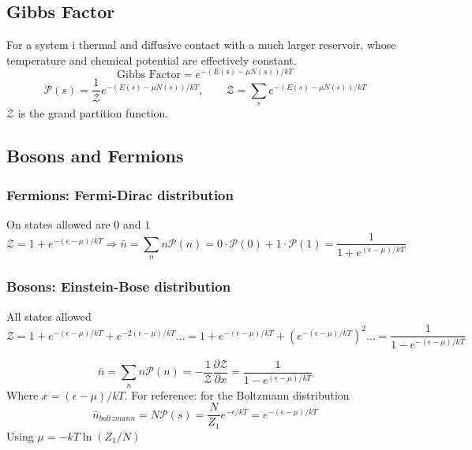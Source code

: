 \documentclass[a4paper,norsk, 10pt]{article}
\begin{document}
\subsection{Gibbs Factor}
For a system i thermal and diffusive contact with a much larger reservoir, whose temperature and chemical potential are effectively constant.
\begin{equation}
\text{Gibbs Factor} = e^{-(E(s) - \mu N(s))/kT}
\end{equation}
\begin{equation}
\mathcal{P}(s) = \frac{1}{\mathcal{Z}}e^{-(E(s) - \mu N(s))/kT}, \qquad \mathcal{Z} = \sum_s e^{-(E(s) - \mu N(s))/kT}
\end{equation}
$\mathcal{Z}$ is the grand partition function.
\subsection{Bosons and Fermions}
\subsubsection{Fermions:  Fermi-Dirac distribution}
On states allowed are $0$ and $1$
\begin{equation}
\mathcal{Z} = 1 + e^{-(\epsilon - \mu)/kT} \Rightarrow \bar{n} = \sum_n n \mathcal{P}(n) = 0\cdot\mathcal{P}(0) + 1\cdot\mathcal{P}(1) = \frac{1}{1 + e^{(\epsilon - \mu)/kT}}
\end{equation}
\subsubsection{Bosons: Einstein-Bose distribution}
All states allowed
\begin{equation}
\mathcal{Z} = 1 + e^{-(\epsilon - \mu)/kT} + e^{-2(\epsilon - \mu)/kT}\ldots = 1 + e^{-(\epsilon - \mu)/kT} + \left( e^{-(\epsilon - \mu)/kT}\right)^2\ldots =\frac{1}{1 - e^{-(\epsilon - \mu)/kT}}
\end{equation}

\begin{equation}
\bar{n} = \sum_n n \mathcal{P}(n) = -\frac{1}{\mathcal{Z}}\frac{\partial \mathcal{Z}}{\partial x} = \frac{1}{1-e^{(\epsilon - \mu)/kT}}
\end{equation}
Where $x = (\epsilon - \mu)/kT$. For reference: for the Boltzmann distribution
\begin{equation}
\bar{n}_{boltzmann} = N\mathcal{P}(s) = \frac{N}{Z_1}e^{-\epsilon/kT} = e^{-(\epsilon-\mu)/kT}
\end{equation}
Using $\mu = -kT\ln (Z_1/N)$
\end{document}
